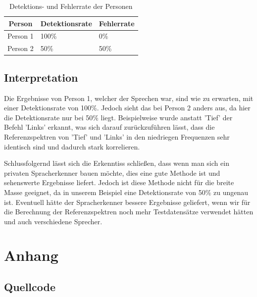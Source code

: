 \documentclass[12pt, oneside, a4paper, \docLanguage]{report}
\begin{document}
\begin{table}[H]
\centering
\begin{tabular}{|l|l|l|}
\hline
\multicolumn{1}{|c|}{\textbf{Person}} & \textbf{Detektionsrate} & \textbf{Fehlerrate} \\ \hline
Person 1     & 100\%         & 0\%       \\ \hline
Person 2     & 50\%         & 50\%       \\ \hline
\end{tabular}
\caption{Detektions- und Fehlerrate der Personen}
\label{fig:VERSUCH_2_rates}
\end{table}
\newpage
\section{Interpretation}
\label{chap:VERSUCH_2_INTERPRETATION}

Die Ergebnisse von Person 1, welcher der Sprechen war, sind wie zu erwarten, mit einer Detektionsrate von 100\%. Jedoch sieht das bei Person 2 anders aus, da hier die Detektionsrate nur bei 50\% liegt. Beispielweise wurde anstatt 'Tief' der Befehl 'Links' erkannt, was sich darauf zurückzuführen lässt, dass die Referenzspektren von 'Tief' und 'Links' in den niedriegen Frequenzen sehr identisch sind und dadurch stark korrelieren.

Schlussfolgernd lässt sich die Erkenntiss schließen, dass wenn man sich ein privaten Spracherkenner bauen möchte, dies eine gute Methode ist und sehenswerte Ergebnisse liefert. Jedoch ist diese Methode nicht für die breite Masse geeignet, da in unserem Beispiel eine Detektionsrate von 50\% zu ungenau ist. Eventuell hätte der Spracherkenner bessere Ergebnisse geliefert, wenn wir für die Berechnung der Referenzspektren noch mehr Testdatensätze verwendet hätten und auch verschiedene Sprecher.

%
%
\renewcommand\thesection{A.\arabic{section}}
\renewcommand\thesubsection{\thesection.\arabic{subsection}}

\chapter*{Anhang}
\label{chap:APPENDIX}
\addtocounter{chapter}{1}
\setcounter{section}{0}

\section{Quellcode}
\label{chap:APPENDIX_SOURCECODE}
\end{document}

